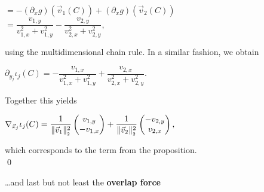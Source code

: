 \begin{proposition}
\begin{center}
		$= -(\partial_x g)(\vec{v}_1(C)) + (\partial_x g)(\vec{v}_2(C))$\\ \smallbreak 
		$= \dfrac{ v_{1,y} }{ v_{1,x}^2 + v_{1,y}^2 } - \dfrac{v_{2,y}}{v_{2,x}^2 + v_{2,y}^2}
		$,
	\end{center}
	using the multidimensional chain rule. In a similar fashion, we obtain
	\begin{center}
		$
		\partial_{y_j} \iota_j(C) = -\dfrac{v_{1,x}}{v_{1,x}^2 + v_{1,y}^2} + \dfrac{v_{2,x}}{v_{2,x}^2 + v_{2,y}^2}.
		$
	\end{center}
	Together this yields
	\begin{center}
		$
		\nabla_{\vec{x}_j} \iota_j(C) = \dfrac{1}{\norm[\vec{v}_1]^2} \begin{pmatrix} v_{1,y} \\ - v_{1,x} \end{pmatrix} + 
		\dfrac{1}{\norm[\vec{v}_2]^2} \begin{pmatrix} -v_{2,y} \\ v_{2,x} \end{pmatrix},
		$
	\end{center}
	which corresponds to the term from the proposition.\\
	\qed 
\end{proposition}

\dots and last but not least the \textbf{overlap force}

